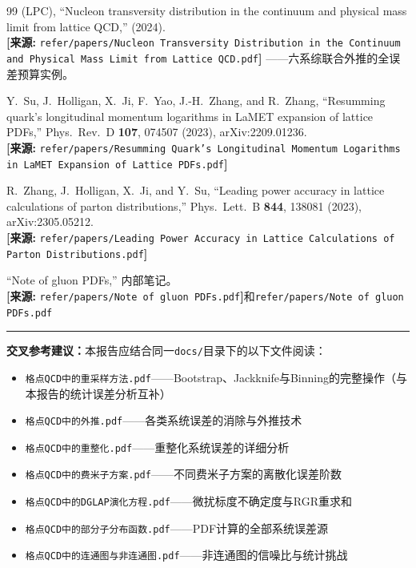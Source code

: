 \documentclass[12pt,a4paper]{ctexart}
\begin{document}
\begin{thebibliography}{99}
(LPC),
``Nucleon transversity distribution in the continuum and physical mass limit from lattice QCD,''
(2024).
\\\textbf{[来源:} \texttt{refer/papers/Nucleon Transversity Distribution in the Continuum and Physical Mass Limit from Lattice QCD.pdf}\textbf{]}
——六系综联合外推的全误差预算实例。

Y.~Su, J.~Holligan, X.~Ji, F.~Yao, J.-H.~Zhang, and R.~Zhang,
``Resumming quark's longitudinal momentum logarithms in LaMET expansion of lattice PDFs,''
Phys.\ Rev.\ D \textbf{107}, 074507 (2023), arXiv:2209.01236.
\\\textbf{[来源:} \texttt{refer/papers/Resumming Quark's Longitudinal Momentum Logarithms in LaMET Expansion of Lattice PDFs.pdf}\textbf{]}

R.~Zhang, J.~Holligan, X.~Ji, and Y.~Su,
``Leading power accuracy in lattice calculations of parton distributions,''
Phys.\ Lett.\ B \textbf{844}, 138081 (2023), arXiv:2305.05212.
\\\textbf{[来源:} \texttt{refer/papers/Leading Power Accuracy in Lattice Calculations of Parton Distributions.pdf}\textbf{]}

``Note of gluon PDFs,'' 内部笔记。
\\\textbf{[来源:} \texttt{refer/papers/Note of gluon PDFs.pdf}\textbf{]}和\texttt{refer/papers/Note of gluon PDFs.pdf}

\end{thebibliography}

\vspace{0.5cm}
\noindent\rule{\textwidth}{0.5pt}
\small
\textbf{交叉参考建议：}本报告应结合同一\texttt{docs/}目录下的以下文件阅读：
\begin{itemize}[nosep]
    \item \texttt{格点QCD中的重采样方法.pdf}——Bootstrap、Jackknife与Binning的完整操作（与本报告的统计误差分析互补）
    \item \texttt{格点QCD中的外推.pdf}——各类系统误差的消除与外推技术
    \item \texttt{格点QCD中的重整化.pdf}——重整化系统误差的详细分析
    \item \texttt{格点QCD中的费米子方案.pdf}——不同费米子方案的离散化误差阶数
    \item \texttt{格点QCD中的DGLAP演化方程.pdf}——微扰标度不确定度与RGR重求和
    \item \texttt{格点QCD中的部分子分布函数.pdf}——PDF计算的全部系统误差源
    \item \texttt{格点QCD中的连通图与非连通图.pdf}——非连通图的信噪比与统计挑战
\end{itemize}
\end{document}
